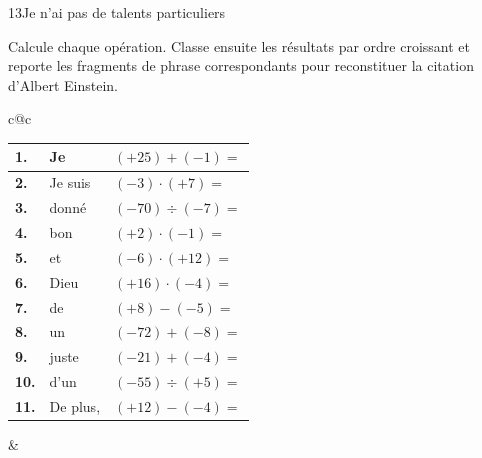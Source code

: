 \begin{exercice}{13}{Je n'ai pas de talents particuliers}

Calcule chaque opération. Classe ensuite les résultats par ordre croissant et reporte les fragments de phrase correspondants pour reconstituer la citation
d'Albert Einstein.

\def\arraystretch{1.25}
\setlength{\tabcolsep}{4pt}
\vspace{2mm}

\begin{center}
\begin{tabular}{c@{\hspace{8mm}}c}

  \begin{tabular}{|>{\centering\arraybackslash}p{6mm}|p{3.5cm}|p{3cm}|}
    \hline
    \cellcolor{gray!40}\textbf{1.}  &Je& $(+25)+(-1)=$               \\ \hline
    \cellcolor{gray!40}\textbf{2.}  &Je suis& $(-3)\cdot(+7)=$              \\ \hline
    \cellcolor{gray!40}\textbf{3.}  &donné& $(-70)\div(-7)=$              \\ \hline
    \cellcolor{gray!40}\textbf{4.}  &bon& $(+2)\cdot(-1)=$               \\ \hline
    \cellcolor{gray!40}\textbf{5.}  &et& $(-6)\cdot(+12)=$             \\ \hline
    \cellcolor{gray!40}\textbf{6.}  &Dieu& $(+16)\cdot(-4)=$             \\ \hline
    \cellcolor{gray!40}\textbf{7.}  &de& $(+8)-(-5)=$        \\ \hline
    \cellcolor{gray!40}\textbf{8.}  &un& $(-72)+(-8)=$                 \\ \hline
    \cellcolor{gray!40}\textbf{9.}  &juste& $(-21)+(-4)=$                 \\ \hline
    \cellcolor{gray!40}\textbf{10.} &d'un& $(-55)\div(+5)=$              \\ \hline
    \cellcolor{gray!40}\textbf{11.} &De plus,& $(+12)-(-4)=$      \\ \hline
  \end{tabular}

  &


\end{tabular}
\end{center}
\end{exercice}
